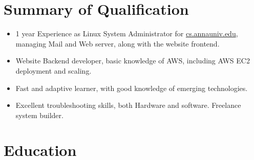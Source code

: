 \documentclass[11pt,letterpaper]{moderncv}
\begin{document}
\maketitle

\section{Summary of Qualification}
\cvline{}
	{
		\begin{itemize}
			\item 1 year Experience as Linux System Administrator for \href{cs.annauniv.edu}{cs.annauniv.edu}, managing Mail and Web server, along with the website frontend.
			\item Website Backend developer, basic knowledge of AWS, including AWS EC2 deployment and scaling.
			\item Fast and adaptive learner, with good knowledge of emerging technologies. 
			\item Excellent troubleshooting skills, both Hardware and software. Freelance system builder.
		\end{itemize}}{}{}{}{}

\section{Education}

%
%
%
\cvline  {}{}
\end{document}
